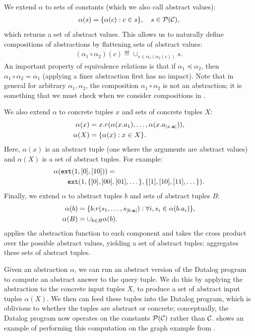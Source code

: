 We extend $\alpha$ to sets of constants (which we also call abstract values):
\begin{align}
\alpha(s) = \{ \alpha(c) : c \in s \}, \quad s \in \mathcal{P}(\mathcal{C}),
\end{align}
which returns a set of abstract values.
This allows us to naturally define compositions of abstractions
by flattening sets of abstract values:
\begin{align}
(\alpha_1 \circ \alpha_2)(c) \eqdef \cup_{s \in \alpha_1(\alpha_2(c))} s.
\end{align}
An important property of equivalence relations is
that if $\alpha_1 \preceq \alpha_2$, then $\alpha_1 \circ \alpha_2 = \alpha_1$
(applying a finer abstraction first has no impact).
Note that in general for arbitrary $\alpha_1,\alpha_2$,
the composition $\alpha_1 \circ \alpha_2$ is not an abstraction;
it is something that we must check when we consider compositions in
.

We also extend $\alpha$ to concrete tuples $x$ and sets of concrete tuples $X$:
\begin{align}
\alpha(x) &= x.r(\alpha(x.a_1), \dots, \alpha(x.a_{|x.\mathbf{a}|})), \\
\alpha(X) &= \{ \alpha(x) : x \in X \}.
\end{align}
Here, $\alpha(x)$ is an abstract tuple (one where the arguments are abstract values)
and $\alpha(X)$ is a set of abstract tuples.
For example:
\begin{align}
& \alpha(\text{\tt ext}(1, [0], [10])) = \\
& \quad\quad \text{\tt ext}(1, \{[0], [00], [01], \dots\}, \{[1], [10], [11], \dots\}). \nonumber
\end{align}
Finally, we extend $\alpha$ to abstract tuples $b$ and sets of abstract tuples $B$:
\begin{align}
\alpha(b) &= \{ b.r(s_1, \dots, s_{|b.\mathbf{a}|}) : \forall i, s_i \in \alpha(b.a_i) \}, \label{eqn:alphab} \\
\alpha(B) &= \cup_{b \in B} \alpha(b). \label{eqn:alphaB}
\end{align}
 applies the abstraction function to each component and takes the cross product over the possible abstract values,
yielding a set of abstract tuples;
 aggregates these sets of abstract tuples.

Given an abstraction $\alpha$,
we can run an abstract version of the Datalog program to compute an abstract answer to the query tuple.
We do this by applying the abstraction to the concrete input tuples $X$,
to produce a set of abstract input tuples $\alpha(X)$.
We then can feed these tuples into the Datalog program,
which is oblivious to whether the tuples are abstract or concrete;
conceptually, the Datalog program now operates on the constants $\mathcal{P}(\mathcal{C})$ rather than $\mathcal{C}$.
 shows an example of performing this computation on the
graph example from .

